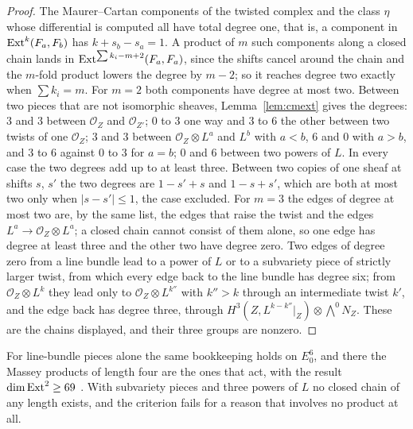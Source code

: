\begin{proof}
The Maurer--Cartan components of the twisted complex and the class $\eta$ whose differential is computed all have total degree one, that is, a component in $\mathrm{Ext}^{k}(F_{a},F_{b})$ has $k+s_{b}-s_{a}=1$. A product of $m$ such components along a closed chain lands in $\mathrm{Ext}^{\sum k_{i}-m+2}(F_{a},F_{a})$, since the shifts cancel around the chain and the $m$-fold product lowers the degree by $m-2$; so it reaches degree two exactly when $\sum k_{i}=m$. For $m=2$ both components have degree at most two. Between two pieces that are not isomorphic sheaves, Lemma~\ref{lem:cmext} gives the degrees: $3$ and $3$ between $\mathcal{O}_{Z}$ and $\mathcal{O}_{Z'}$; $0$ to $3$ one way and $3$ to $6$ the other between two twists of one $\mathcal{O}_{Z}$; $3$ and $3$ between $\mathcal{O}_{Z}\otimes L^{a}$ and $L^{b}$ with $a<b$, $6$ and $0$ with $a>b$, and $3$ to $6$ against $0$ to $3$ for $a=b$; $0$ and $6$ between two powers of $L$. In every case the two degrees add up to at least three. Between two copies of one sheaf at shifts $s$, $s'$ the two degrees are $1-s'+s$ and $1-s+s'$, which are both at most two only when $|s-s'|\le1$, the case excluded. For $m=3$ the edges of degree at most two are, by the same list, the edges that raise the twist and the edges $L^{a}\to\mathcal{O}_{Z}\otimes L^{a}$; a closed chain cannot consist of them alone, so one edge has degree at least three and the other two have degree zero. Two edges of degree zero from a line bundle lead to a power of $L$ or to a subvariety piece of strictly larger twist, from which every edge back to the line bundle has degree six; from $\mathcal{O}_{Z}\otimes L^{k}$ they lead only to $\mathcal{O}_{Z}\otimes L^{k''}$ with $k''>k$ through an intermediate twist $k'$, and the edge back has degree three, through $H^{3}(Z,L^{k-k''}|_{Z})\otimes\bigwedge^{0}N_{Z}$. These are the chains displayed, and their three groups are nonzero.

\end{proof}

For line-bundle pieces alone the same bookkeeping holds on $E_{0}^{6}$, and there the Massey products of length four are the ones that act, with the result $\dim\mathrm{Ext}^{2}\ge69$ \cite[Thm.~18.35]{BMB26}. With subvariety pieces and three powers of $L$ no closed chain of any length exists, and the criterion fails for a reason that involves no product at all.


